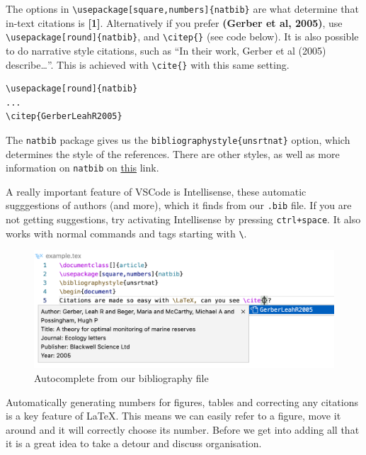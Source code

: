 The options in \verb|\usepackage[square,numbers]{natbib}| are what determine that in-text citations is \textbf{[1]}.
Alternatively if you prefer \textbf{(Gerber et al, 2005)}, use \verb|\usepackage[round]{natbib}|, and \verb|\citep{}| (see code below).
It is also possible to do narrative style citations, such as ``In their work, Gerber et al (2005) describe\dots''. This is achieved with \verb|\cite{}| with this same setting.

\begin{lstlisting}
\usepackage[round]{natbib}
...
\citep{GerberLeahR2005}
\end{lstlisting}

The \verb|natbib| package gives us the \verb|bibliographystyle{unsrtnat}| option, which determines the style of the references.
There are other styles, as well as more information on \verb|natbib| on \href{https://ftp.eq.uc.pt/software/TeX/macros/latex/contrib/natbib/natnotes.pdf}{this} link. 

A really important feature of VSCode is Intellisense, these automatic sugggestions of authors (and more), which it finds from our \verb|.bib| file.
If you are not getting suggestions, try activating Intellisense by pressing \verb|ctrl+space|.
It also works with normal commands and tags starting with \texttt{\textbackslash}.
\begin{figure}[h]
  \centering
  \includegraphics[width=\textwidth]{figures/intellisense.png}
  \caption{Autocomplete from our bibliography file}
  \label{fig:intellisense}
\end{figure}

Automatically generating numbers for figures, tables and correcting any citations is a key feature of \LaTeX.
This means we can easily refer to a figure, move it around and it will correctly choose its number.
Before we get into adding all that it is a great idea to take a detour and discuss organisation.